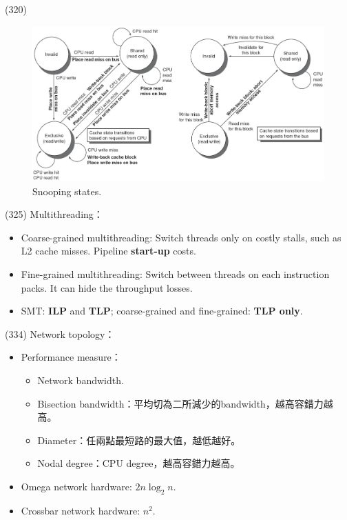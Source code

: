 \item \begin{theorem}{(320)} \quad\quad
    \begin{figure}[H]
        \centering
        \includegraphics[scale=0.5]{img/snooping.png}
        \caption{Snooping states.}
        \label{img:snooping}
    \end{figure}
\end{theorem}

\item \begin{theorem}{(325)} Multithreading： \begin{itemize}
        \item Coarse-grained multithreading: Switch threads only on costly stalls, such as L2 cache misses. Pipeline \textbf{start-up} costs.
        \item Fine-grained multithreading: Switch between threads on each instruction packs. It can hide the throughput losses.
        \item SMT: \textbf{ILP} and \textbf{TLP}; coarse-grained and fine-grained: \textbf{TLP only}.
    \end{itemize}
\end{theorem}

\item \begin{theorem}{(334)} Network topology： \begin{itemize}
        \item Performance measure：\begin{itemize}
            \item Network bandwidth.
            \item Bisection bandwidth：平均切為二所減少的bandwidth，越高容錯力越高。
            \item Diameter：任兩點最短路的最大值，越低越好。
            \item Nodal degree：CPU degree，越高容錯力越高。
        \end{itemize}
        \item Omega network hardware: $2n\log_2 n$.
        \item Crossbar network hardware: $n^2$.
    \end{itemize}
\end{theorem}
